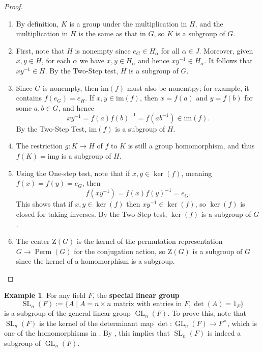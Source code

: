 \documentclass[12pt]{report}
\numberwithin{equation}{section}
\numberwithin{theorem}{chapter}
\theoremstyle{definition}
\newtheorem{example}[theorem]{Example}
\newtheorem*{basic properties}{Basic Properties}
\newtheorem*{Important Remark}{Important Remark}
\newcommand{\df}[1]{{\bf #1}\index{#1}}
\DeclareMathOperator{\GL}{GL}
\DeclareMathOperator{\SL}{SL}
\DeclareMathOperator{\Perm}{Perm}
\renewcommand{\ker}{\operatorname{ker}}
\begin{document}
\begin{proof}$\,$

\vspace{-0.6em}
\begin{enumerate}[itemsep=-0.1em,label=(\alph*)]
	\item By definition, $K$ is a group under the multiplication in $H$, and the multiplication in $H$ is the same as that in $G$, so $K$ is a subgroup of $G$.
	\item First, note that $H$ is nonempty since $e_G \in H_\alpha$ for all $\alpha\in J$. Moreover, given $x,y\in H$, for each $\alpha$ we have $x,y \in H_\alpha$ and hence $xy^{-1} \in H_\alpha$. It follows that $xy^{-1} \in H$. By the Two-Step test, $H$ is a subgroup of $G$. 
	\item Since $G$ is nonempty, then $\mathrm{im}(f)$ must also be nonemtpy; for example, it contains $f(e_G) = e_H$. If $x,y \in \mathrm{im}(f)$, then $x = f(a)$ and $y = f(b)$ for some $a,b \in G$, and hence 
	$$xy^{-1} =f(a)f(b)^{-1} = f(ab^{-1}) \in \mathrm{im}(f).$$
	By the Two-Step Test, $\mathrm{im}(f)$ is a subgroup of $H$. 
	
	\item The restriction $g\!: K \to H$ of $f$ to $K$ is still a group homomorphism, and thus $f(K) = \mathrm{im} g$ is a subgroup of $H$. 
	
	\item Using the One-step test, note that if $x, y \in \ker(f)$, meaning $f(x)=f(y)=e_G$, then 
	$$f(xy^{-1})=f(x)f(y)^{-1}=e_G.$$ 
	This shows that if $x,y\in \ker(f)$ then $xy^{-1}\in \ker(f)$, so $\ker(f)$ is closed for taking inverses. By the Two-Step test, $\ker(f)$ is a subgroup of $G$.
	\item The center $\mathrm{Z}(G)$ is the kernel of the permutation representation $G\to \Perm(G)$ for the conjugation action, so $\mathrm{Z}(G)$ is a subgroup of $G$ since the kernel of a homomorphism is a subgroup.\qedhere 
\end{enumerate} 
\end{proof}




\begin{example}
For any field $F$, the \df{special linear group}
$$\SL_n(F) := \{A \mid A = n\times n \text{ matrix with entries in } F, \det(A)=1_F\}$$
is a subgroup of the general linear group $\GL_n(F)$. To prove this, note that $\SL_n(F)$ is the kernel of the determinant map $\det\!:\GL_n(F)\to F^\times$, which is one of the homomorphisms in . By , this implies that $\SL_n(F)$ is indeed a subgroup of $\GL_n(F)$.
\end{example}
\end{document}
